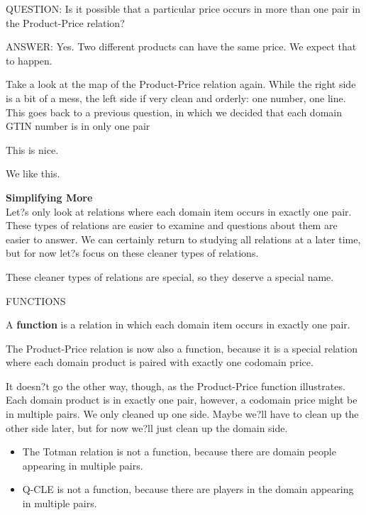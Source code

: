 \documentclass{ximera}
\begin{document}
\begin{dialogue}
\item[QUESTION:] Is it possible that a particular price occurs in more than one pair in the Product-Price relation? \\
\item[ANSWER:] Yes. Two different products can have the same price.  We expect that to happen. \\
\end{dialogue}


Take a look at the map of the Product-Price relation again.  While the right side is a bit of a mess, the left side if very clean and orderly: one number, one line.  This goes back to a previous question, in which we decided that each domain GTIN number is in only one pair



This is nice. 


We like this.

\textbf{Simplifying More} \\
Let?s only look at relations where each domain item occurs in exactly one pair. These types of relations are easier to examine and questions about them are easier to answer.  We can certainly return to studying all relations at a later time, but for now let?s focus on these cleaner types of relations.  

These cleaner types of relations are special, so they deserve a special name.


\begin{center}
FUNCTIONS
\end{center}

\begin{definition}
A \textbf{function} is a relation in which each domain item occurs in exactly one pair.
\end{definition}



The Product-Price relation is now also a function, because it is a special relation where each domain product is paired with exactly one codomain price.

It doesn?t go the other way, though, as the Product-Price function illustrates. Each domain product is in exactly one pair, however, a codomain price might be in multiple pairs.  We only cleaned up one side.  Maybe we?ll have to clean up the other side later, but for now we?ll just clean up the domain side.

\begin{itemize}
\item The Totman relation is not a function, because there are domain people appearing in multiple pairs.
\item Q-CLE is not a function, because there are players in the domain appearing in multiple pairs.
\end{itemize}
\end{document}
